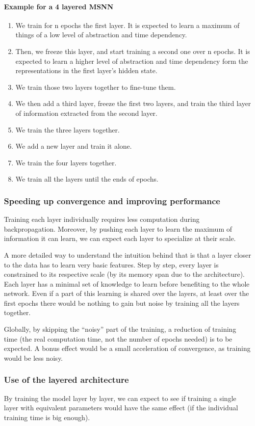\newpage
\paragraph{Example for a 4 layered
MSNN}

\begin{enumerate}
\def\labelenumi{\arabic{enumi}.}
\item
  We train for n epochs the first layer. It is expected to learn a
  maximum of things of a low level of abstraction and time dependency.
\item
  Then, we freeze this layer, and start training a second one over n
  epochs. It is expected to learn a higher level of abstraction and time
  dependency form the representations in the first layer's hidden state.
\item
  We train those two layers together to fine-tune them.
\item
  We then add a third layer, freeze the first two layers, and train the
  third layer of information extracted from the second layer.
\item
  We train the three layers together.
\item
  We add a new layer and train it alone.
\item
  We train the four layers together.
\item
  We train all the layers until the ends of epochs.
\end{enumerate}

\subsubsection{Speeding up convergence and improving
performance}

Training each layer individually requires less computation during
backpropagation. Moreover, by pushing each layer to learn the maximum of
information it can learn, we can expect each layer to specialize at
their scale.

A more detailed way to understand the intuition behind that is that a
layer closer to the data has to learn very basic features. Step by step,
every layer is constrained to its respective scale (by its memory span
due to the architecture). Each layer has a minimal set of knowledge to
learn before benefiting to the whole network. Even if a part of this
learning is shared over the layers, at least over the first epochs there
would be nothing to gain but noise by training all the layers together.

Globally, by skipping the ``noisy'' part of the training, a reduction of
training time (the real computation time, not the number of epochs
needed) is to be expected. A bonus effect would be a small acceleration
of convergence, as training would be less noisy.

\subsubsection{Use of the layered
architecture}

By training the model layer by layer, we can expect to see if training a
single layer with equivalent parameters would have the same effect (if
the individual training time is big enough).
